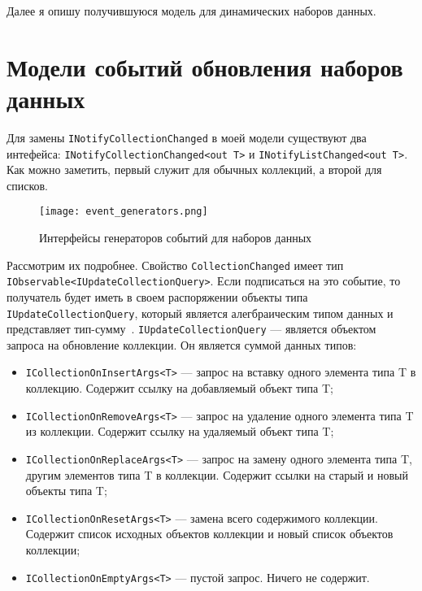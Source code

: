 Далее я опишу получившуюся модель для динамических наборов данных.

\section{Модели событий обновления наборов данных}
\label{sub:research:event_model}

Для замены \lstinline[style=csharpinlinestyle]!INotifyCollectionChanged! в моей модели существуют два интефейса:
\lstinline[style=csharpinlinestyle]!INotifyCollectionChanged<out T>! и \lstinline[style=csharpinlinestyle]!INotifyListChanged<out T>!.
Как можно заметить, первый служит для обычных коллекций, а второй для списков.

\begin{figure}[ht]
\centering
  \texttt{[image: event\_generators.png]}
  \caption{ Интерфейсы генераторов событий для наборов данных }
  \label{fig:event_generators}
\end{figure}

Рассмотрим их подробнее. Свойство \lstinline[style=csharpinlinestyle]!CollectionChanged! имеет тип \lstinline[style=csharpinlinestyle]!IObservable<IUpdateCollectionQuery>!.
Если подписаться на это событие, то получатель будет иметь в своем распоряжении объекты типа \lstinline[style=csharpinlinestyle]!IUpdateCollectionQuery!,
который является алегбраическим типом данных и представляет тип-сумму~\cite{algebraic_data_type}.
\lstinline[style=csharpinlinestyle]!IUpdateCollectionQuery! --- является объектом запроса на обновление коллекции.
Он является суммой данных типов:

\begin{itemize}
  \item \lstinline[style=csharpinlinestyle]!ICollectionOnInsertArgs<T>! --- запрос на вставку одного элемента типа T в коллекцию. Содержит ссылку на добавляемый объект типа T;
  \item \lstinline[style=csharpinlinestyle]!ICollectionOnRemoveArgs<T>! --- запрос на удаление одного элемента типа T из коллекции. Содержит ссылку на удаляемый объект типа T;
  \item \lstinline[style=csharpinlinestyle]!ICollectionOnReplaceArgs<T>! --- запрос на замену одного элемента типа T, другим элементов типа T в коллекции. Содержит ссылки на старый и новый объекты типа T;
  \item \lstinline[style=csharpinlinestyle]!ICollectionOnResetArgs<T>! --- замена всего содержимого коллекции. Содержит список исходных объектов коллекции и новый список объектов коллекции;
  \item \lstinline[style=csharpinlinestyle]!ICollectionOnEmptyArgs<T>! --- пустой запрос. Ничего не содержит.
\end{itemize}

